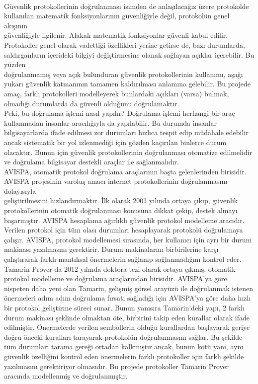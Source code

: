 \documentclass[a4paper, 12pt, titlepage]{article}
\begin{document}
\bigskip
\\ Güvenlik protokollerinin doğrulanması isimden de anlaşılacağız üzere protokolde kullanılan matematik fonksiyonlarının güvenliğiyle değil, protokolün genel akışının\\ güvenliğiyle ilgilenir. Alakalı matematik fonksiyonlar güvenli kabul edilir. Protokoller genel olarak vadettiği özellikleri yerine getirse de, bazı durumlarda, saldırganların içerideki bilgiyi değiştirmesine olanak sağlayan açıklar içerebilir. Bu yüzden \\doğrulanmamış veya açık bulunduran güvenlik protokollerinin kullanımı, aşağı yukarı güvenlik katmanının tamamen kaldırılması anlamına gelebilir. Bu projede amaç, farklı protokolleri modelleyerek bunlardaki açıkları (varsa) bulmak, olmadığı durumlarda da güvenli olduğunu doğrulamaktır.
\bigskip
\\ Peki, bu doğrulama işlemi nasıl yapılır? Doğrulama işlemi herhangi bir araç kullanmadan insanlar aracılığıyla da yapılabilir. Bu durumda insanlar bilgisayarlarda ifade edilmesi zor durumları hızlıca tespit edip müdahale edebilir ancak sistematik bir yol izlenmediği için gözden kaçırılan binlerce durum olacaktır. Bunun için güvenlik protokollerinin doğrulanması otomatize edilmelidir ve doğrulama bilgisayar destekli araçlar ile sağlanmalıdır.
\bigskip
\\ AVISPA, otomatik protokol doğrulama araçlarının başta gelenlerinden birisidir. AVISPA projesinin varoluş amacı internet protokollerinin doğrulanmasını dolayısıyla \\geliştirilmesini hızlandırmaktır. İlk olarak 2001 yılında ortaya çıkıp, güvenlik protokollerinin otomatik doğrulanması konusuna dikkat çekip, destek almayı başarmıştır. AVISPA hesaplama ağırlıklı güvenlik protokol modelleme aracıdır. Verilen protokol için tüm olası durumları hesaplayarak protokolü doğrulamaya çalışır. AVISPA, protokol modellemesi sırasında, her kullanıcı için ayrı bir durum makinası yazılmasını gerektirir. Durum makinalarını birbirilerine karşı çalıştırarak farklı mantıksal önermelerin sağlanıp sağlanmadığını kontrol eder.
\bigskip
\\ Tamarin Prover da 2012 yılında doktora tezi olarak ortaya çıkmış, otomatik protokol modelleme ve doğrulama araçlarından birisidir. AVISPA'ya göre nispeten daha yeni olan Tamarin, gelişmiş görsel arayüzü ile doğrulanmak istenen önermeleri adım adım doğrulama fırsatı sağladığı için AVISPA'ya göre daha hızlı bir protokol geliştirme süreci sunar. Bunun yanısıra Tamarin'deki yapı, 2 farklı durum makinası şeklinde olmaktan öte, birbirini takip eden kurallar olarak ifade edilmiştir. Önermelerde verilen sembollerin olduğu kurallardan başlayarak geriye doğru önceki kuralları tarayarak protokolün doğrulanmasını sağlar. Bu şekilde tüm durumları tarama gereği ortadan kalkmıştır ancak, bunun kötü yanı, aynı güvenlik özelliğini kontrol eden önermelerin farklı protokoller için farklı şekilde yazılmasını gerektiriyor olmasıdır. Bu projede protokoller Tamarin Prover aracında modellenmiş ve doğrulanmıştır.
\end{document}
